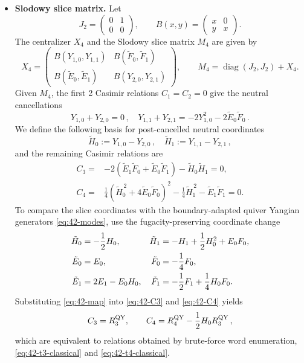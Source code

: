\documentclass[12pt,a4paper]{article}
\begin{document}
\begin{itemize}
\item \textbf{Slodowy slice matrix.} 
Let
\begin{equation}
 J_2=\begin{pmatrix}0&1\\0&0\end{pmatrix},\qquad
 B(x,y)=\begin{pmatrix}x&0\\y&x\end{pmatrix}.
 \label{eq:u24-blocks}
\end{equation}
The centralizer $X_4$ and the Slodowy slice matrix $M_4$  are given by
\begin{equation}
 X_4=\begin{pmatrix}
 B(Y_{1,0},Y_{1,1})&B(\tilde{F}_0,\tilde{F}_1)\\
 B(\tilde{E}_0,\tilde{E}_1)&B(Y_{2,0},Y_{2,1})
 \end{pmatrix},\qquad
 M_4=\operatorname{diag}(J_2,J_2)+X_4.
 \label{eq:u24-slice}
\end{equation}
Given $M_4$, the first 2 Casimir relations $C_1=C_2=0$ give the neutral cancellations
\begin{equation}
 Y_{1,0}+Y_{2,0}=0\,,\quad
 Y_{1,1}+Y_{2,1}=-2Y_{1,0}^2-2\tilde{E}_0\tilde{F}_0\,.
 \label{eq:u24-low-casimirs}
\end{equation}
We define the following basis for post-cancelled neutral coordinates
\begin{equation}
    \tilde{H}_{0}:=Y_{1,0}-Y_{2,0}\,,
 \quad \tilde{H}_{1}:=Y_{1,1}-Y_{2,1}\,,
\end{equation}
and the remaining Casimir relations are
\begin{align}
 C_3={}&-2\left(\tilde{E}_1\tilde{F}_0+\tilde{E}_0\tilde{F}_1\right)
 -\tilde{H}_{0}\tilde{H}_{1}=0,
 \label{eq:42-C3}\\
 C_4={}&\frac14\left(\tilde{H}_{0}^{\,2}+4\tilde{E}_0\tilde{F}_0\right)^2
 -\frac14\tilde{H}_{1}^{\,2}-\tilde{E}_1\tilde{F}_1=0.
 \label{eq:42-C4}
\end{align}
To compare the slice coordinates with the boundary-adapted quiver Yangian generators \eqref{eq:42-modes}, use the
fugacity-preserving coordinate change
\begin{align}
 \tilde{H}_{0}&=-\frac12H_0,
 &\tilde{H}_{1}&=-H_1+\frac12H_0^2+E_0F_0,
 \notag\\
 \tilde E_0&=E_0,
 &\tilde F_0&=-\frac14F_0,
 \notag\\
 \tilde E_1&=2E_1-E_0H_0,
 &\tilde F_1&=-\frac12F_1+\frac14H_0F_0.
 \label{eq:42-map}
\end{align}
Substituting \eqref{eq:42-map} into
\eqref{eq:42-C3} and \eqref{eq:42-C4} yields
\begin{equation}
 C_3=R_3^{\rm QY},\qquad
 C_4=R_4^{\rm QY}-\frac12H_0R_3^{\rm QY}\,,
 \label{eq:42-comparison}
\end{equation}
which are equivalent to relations obtained by brute-force word enumeration, \eqref{eq:42-t3-classical} and \eqref{eq:42-t4-classical}.

\end{itemize}
\end{document}
